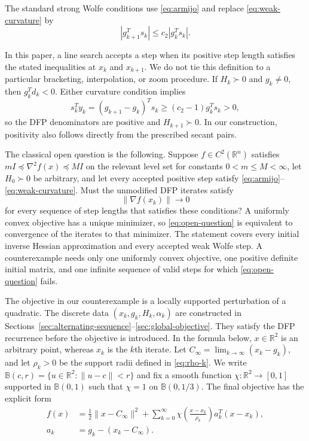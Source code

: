 \documentclass[11pt]{article}
\newcommand{\R}{\mathbb R}
\begin{document}
The standard strong Wolfe conditions use \eqref{eq:armijo} and replace
\eqref{eq:weak-curvature} by
\begin{equation}\label{eq:strong-curvature}
|g_{k+1}^Ts_k|\le c_2|g_k^Ts_k|.
\end{equation}

In this paper, a line search accepts a step when its positive step length
satisfies the stated inequalities at $x_k$ and $x_{k+1}$.  We do not tie this
definition to a particular bracketing, interpolation, or zoom procedure.  If
$H_k\succ0$ and $g_k\ne0$, then
$g_k^Td_k<0$.  Either curvature condition
implies
\[
s_k^Ty_k=(g_{k+1}-g_k)^Ts_k
\ge (c_2-1)g_k^Ts_k>0,
\]
so the DFP denominators are positive and $H_{k+1}\succ0$.  In our
construction, positivity also follows directly from the prescribed secant
pairs.

The classical open question is the following.  Suppose
$f\in C^2(\R^n)$ satisfies
$mI\preceq\nabla^2f(x)\preceq MI$ on the relevant level set for constants
$0<m\le M<\infty$, let $H_0\succ0$ be arbitrary, and let every accepted
positive step satisfy \eqref{eq:armijo}--\eqref{eq:weak-curvature}.  Must the
unmodified DFP iterates satisfy
\begin{equation}\label{eq:open-question}
\|\nabla f(x_k)\|\longrightarrow0
\end{equation}
for every sequence of step lengths that satisfies these conditions?  A
uniformly convex objective has a unique minimizer, so
\eqref{eq:open-question} is equivalent to
convergence of the iterates to that minimizer.  The statement covers every
initial inverse Hessian approximation and every accepted weak Wolfe step.  A
counterexample needs only one uniformly convex objective, one positive
definite initial matrix, and one infinite sequence of valid steps for which
\eqref{eq:open-question} fails.


The objective in our counterexample is a locally supported perturbation of a
quadratic.  The discrete data $(x_k,g_k,H_k,\alpha_k)$ are constructed in
Sections~\ref{sec:alternating-sequence}--\ref{sec:global-objective}.  They
satisfy the DFP recurrence before the objective is introduced.  In the formula
below, $x\in\R^2$ is an arbitrary point, whereas $x_k$ is the $k$th iterate.
Let $C_\infty=\lim_{k\to\infty}(x_k-g_k)$, and let $\rho_k>0$ be the support
radii defined in \eqref{eq:rho-k}.  We write
$\mathbb B(c,r)=\{u\in\R^2:\|u-c\|<r\}$ and fix a smooth function
$\chi:\R^2\to[0,1]$ supported in $\mathbb B(0,1)$ such that $\chi=1$ on
$\mathbb B(0,1/3)$.  The final objective has the explicit form
\begin{equation}\label{eq:objective}
\begin{aligned}
f(x)&=\frac12\|x-C_\infty\|^2
+\sum_{k=0}^\infty
\chi\!\left(\frac{x-x_k}{\rho_k}\right)a_k^T(x-x_k),\\
a_k&=g_k-(x_k-C_\infty).
\end{aligned}
\end{equation}
\end{document}
